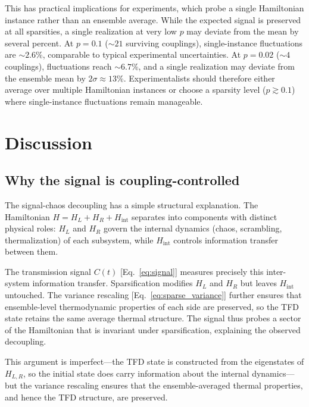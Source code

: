\documentclass[aps,prd,twocolumn,superscriptaddress,nofootinbib,floatfix]{revtex4-2}
\begin{document}
This has practical implications for experiments, which probe a single
Hamiltonian instance rather than an ensemble average. While the expected
signal is preserved at all sparsities, a single realization at very low $p$
may deviate from the mean by several percent. At $p = 0.1$ (${\sim}21$
surviving couplings), single-instance fluctuations are ${\sim}2.6\%$,
comparable to typical experimental uncertainties. At $p = 0.02$
(${\sim}4$ couplings), fluctuations reach ${\sim}6.7\%$, and a single
realization may deviate from the ensemble mean by $2\sigma \approx 13\%$.
Experimentalists should therefore either average over multiple
Hamiltonian instances or choose a sparsity level ($p \gtrsim 0.1$) where
single-instance fluctuations remain manageable.

\section{Discussion}
\label{sec:discussion}

\subsection{Why the signal is coupling-controlled}
\label{sec:mechanism}

The signal-chaos decoupling has a simple structural explanation. The
Hamiltonian $H = H_L + H_R + H_\mathrm{int}$ separates into components
with distinct physical roles: $H_L$ and $H_R$ govern the internal
dynamics (chaos, scrambling, thermalization) of each subsystem, while
$H_\mathrm{int}$ controls information transfer between them.

The transmission signal $C(t)$ [Eq.~\eqref{eq:signal}] measures precisely
this inter-system information transfer. Sparsification modifies $H_L$ and
$H_R$ but leaves $H_\mathrm{int}$ untouched. The variance rescaling
[Eq.~\eqref{eq:sparse_variance}] further ensures that ensemble-level
thermodynamic properties of each side are preserved, so the TFD state
retains the same average thermal structure. The signal thus probes a sector
of the Hamiltonian that is invariant under sparsification, explaining the
observed decoupling.

This argument is imperfect---the TFD state is constructed from the
eigenstates of $H_{L,R}$, so the initial state does carry information
about the internal dynamics---but the variance rescaling ensures that
the ensemble-averaged thermal properties, and hence the TFD structure,
are preserved.
\end{document}
